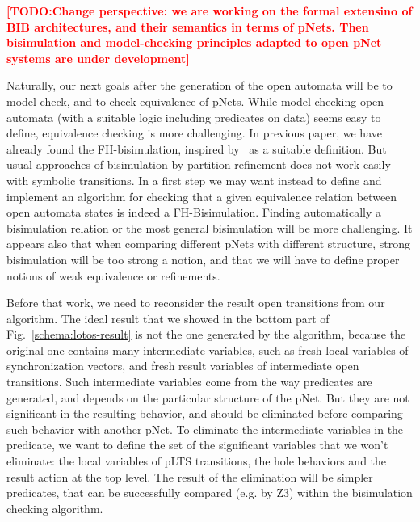 \documentclass{lncs/llncs}
\newcommand{\TODO}[1]{\textcolor{red}{\textbf{[TODO:#1]}}}
\begin{document}
\TODO{Change perspective: we are working on the formal extensino of
  BIB architectures, and their semantics in terms of pNets. Then
  bisimulation and model-checking principles adapted to open pNet
  systems are under development}

Naturally, our next goals after the generation of the open automata
will be to model-check, and to check equivalence of  pNets. While
model-checking open automata (with a suitable logic including
predicates on data) seems easy to define, equivalence checking is more challenging.
In previous paper, we
have already found the FH-bisimulation, inspired by~\cite{deSimone85} as a
suitable definition. But usual approaches of bisimulation by partition
refinement does not work easily with symbolic transitions. In a first
step we may want instead to define and implement an algorithm for
checking that a given equivalence relation between open automata 
states is indeed a FH-Bisimulation. Finding automatically a
bisimulation relation or the most general bisimulation will be more
challenging. It appears also that when comparing different pNets with
different structure, strong bisimulation will be too strong a notion,
and that we will have to define proper notions of weak equivalence or
refinements. 

Before that work, we need to reconsider the result open transitions
from our algorithm. The ideal
result that we showed in the bottom part of
Fig.~\ref{schema:lotos-result} is not the one generated by the algorithm,
because the original one contains many intermediate
variables, such as fresh local variables of synchronization
vectors, and fresh result variables of intermediate open transitions.
Such intermediate variables come from the way predicates are
generated, and depends on the particular structure of the pNet. But
they are not significant in the resulting behavior, and should be
eliminated before comparing such behavior with another pNet.
To eliminate the intermediate variables in the predicate, we want to define
the set of the significant variables that we won't eliminate: the
local variables of pLTS transitions, the hole behaviors and the result
action at the top level.
The result of the elimination will be simpler predicates, that can be
successfully compared (e.g. by Z3) within the bisimulation checking
algorithm.





% 

\end{document}
